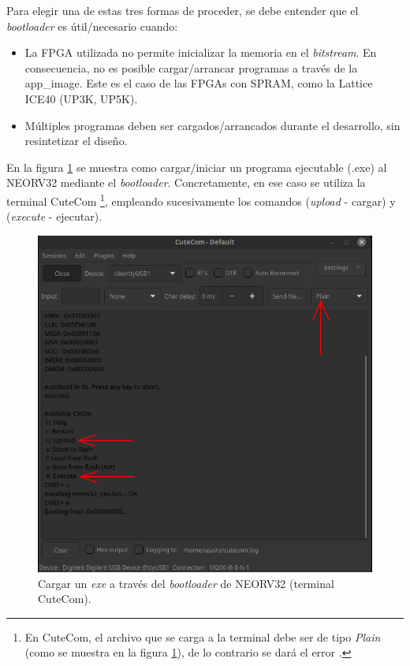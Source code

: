 Para elegir una de estas tres formas de proceder, se debe entender que el \textit{bootloader} es útil/necesario cuando:

    \begin{itemize}
        \item La FPGA utilizada no permite inicializar la memoria en el \textit{bitstream}. 
En consecuencia, no es posible cargar/arrancar programas a través de la app\_image.
Este es el caso de las FPGAs con SPRAM, como la Lattice ICE40 (UP3K, UP5K).
        \item Múltiples programas deben ser cargados/arrancados durante el desarrollo, sin resintetizar el diseño.
    \end{itemize} 

En la figura \ref{fig:boot} se muestra como cargar/iniciar un programa ejecutable (.exe) al NEORV32 mediante el \textit{bootloader}. 
Concretamente, en ese caso se utiliza la terminal CuteCom \footnote {En CuteCom, el archivo que se carga a la terminal debe ser de tipo \textit{Plain} (como se muestra en la figura \ref{fig:boot}), de lo contrario se dará el error .}, empleando sucesivamente los comandos  (\textit{upload} - cargar) y  (\textit{execute} - ejecutar).

\begin{figure}[h!]
    \centering
    \includegraphics[width=14cm]{Figuras/cutecom_cmd_upload.png}
    \caption{Cargar un \textit{exe} a través del \textit{bootloader} de NEORV32 (terminal CuteCom).}
    \label{fig:boot}
\end{figure}


